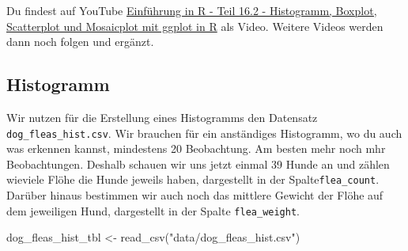 \documentclass[
  letterpaper,
]{scrbook}
\newenvironment{Shaded}{\begin{snugshade}}{\end{snugshade}}
\newcommand{\FunctionTok}[1]{\textcolor[rgb]{0.28,0.35,0.67}{#1}}
\newcommand{\NormalTok}[1]{\textcolor[rgb]{0.00,0.23,0.31}{#1}}
\newcommand{\OtherTok}[1]{\textcolor[rgb]{0.00,0.23,0.31}{#1}}
\newcommand{\StringTok}[1]{\textcolor[rgb]{0.13,0.47,0.30}{#1}}
\begin{document}
\begin{tcolorbox}[enhanced jigsaw, coltitle=black, titlerule=0mm, bottomrule=.15mm, opacityback=0, opacitybacktitle=0.6, leftrule=.75mm, title=\textcolor{quarto-callout-tip-color}{\faLightbulb}\hspace{0.5em}{Histogramm, Boxplot, Scatterplot und Mosaicplot im Video}, toprule=.15mm, bottomtitle=1mm, toptitle=1mm, left=2mm, breakable, arc=.35mm, colback=white, rightrule=.15mm, colbacktitle=quarto-callout-tip-color!10!white, colframe=quarto-callout-tip-color-frame]
Du findest auf YouTube \href{https://youtu.be/Zdw6NlLauNw}{Einführung in
R - Teil 16.2 - Histogramm, Boxplot, Scatterplot und Mosaicplot mit
ggplot in R} als Video. Weitere Videos werden dann noch folgen und
ergänzt.
\end{tcolorbox}

\hypertarget{sec-eda-histogramm}{%
\subsection{Histogramm}\label{sec-eda-histogramm}}

Wir nutzen für die Erstellung eines Histogramms den Datensatz
\texttt{dog\_fleas\_hist.csv}. Wir brauchen für ein anständiges
Histogramm, wo du auch was erkennen kannst, mindestens 20 Beobachtung.
Am besten mehr noch mhr Beobachtungen. Deshalb schauen wir uns jetzt
einmal 39 Hunde an und zählen wieviele Flöhe die Hunde jeweils haben,
dargestellt in der Spalte\texttt{flea\_count}. Darüber hinaus bestimmen
wir auch noch das mittlere Gewicht der Flöhe auf dem jeweiligen Hund,
dargestellt in der Spalte \texttt{flea\_weight}.

\begin{Shaded}
\begin{Highlighting}[]
\NormalTok{dog\_fleas\_hist\_tbl }\OtherTok{\textless{}{-}} \FunctionTok{read\_csv}\NormalTok{(}\StringTok{"data/dog\_fleas\_hist.csv"}\NormalTok{)}
\end{Highlighting}
\end{Shaded}
\end{document}
